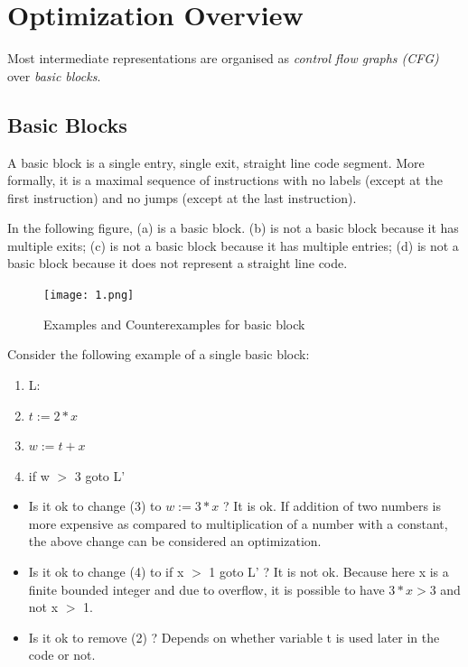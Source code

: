 \section{Optimization Overview}

Most intermediate representations are organised as \textit{control flow graphs (CFG)} over \textit{basic blocks}.

\subsection{Basic Blocks}

A basic block is a single entry, single exit, straight line code segment. More formally, it is a maximal sequence of instructions with no labels (except at the first instruction) and no jumps (except at the last instruction).

In the following figure, (a) is a basic block. (b) is not a basic block because it has multiple exits; (c) is not a basic block because it has multiple entries; (d) is not a basic block because it does not represent a straight line code. 

\begin{figure}[htp]
\centering
\texttt{[image: 1.png]}
\caption{Examples and Counterexamples for basic block}
\end{figure}

Consider the following example of a single basic block:

\begin{enumerate}
    \item L:
    \item \(t := 2 * x\)
    \item \(w := t + x\)
    \item if w \(>\) 3 goto L'
\end{enumerate}

\begin{itemize}
    \item Is it ok to change (3) to \(w := 3 * x\) ?
    It is ok. If addition of two numbers is more expensive as compared to multiplication of a number with a constant, the above change can be considered an optimization.
    \item Is it ok to change (4) to if x \(>\) 1 goto L' ? It is not ok. Because here x is a finite bounded integer and due to overflow, it is possible to have \(3 * x > 3\) and not x \(>\) 1.
    \item Is it ok to remove (2) ? Depends on whether variable t is used later in the code or not.
\end{itemize}

